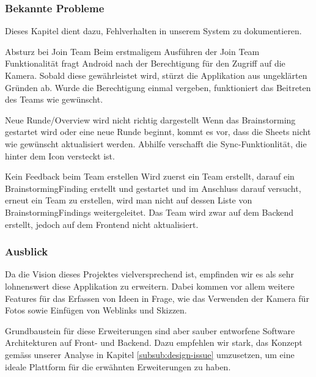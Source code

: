 \subsubsection{Bekannte Probleme}
Dieses Kapitel dient dazu, Fehlverhalten in unserem System zu dokumentieren.

\begin{basedescript}{
		\desclabelstyle{\multilinelabel}
		\desclabelwidth{4.5cm}
		\setlength{\itemsep}{5ex}}
	\item [Absturz bei Join Team] Beim erstmaligem Ausführen der Join Team Funktionalität fragt Android nach der Berechtigung für den Zugriff auf die Kamera. Sobald diese gewährleistet wird, stürzt die Applikation aus ungeklärten Gründen ab. Wurde die Berechtigung einmal vergeben, funktioniert das Beitreten des Teams wie gewünscht.
	
	\item [Neue Runde/Overview wird nicht richtig dargestellt] 
	Wenn das Brainstorming gestartet wird oder eine neue Runde beginnt, kommt es vor, dass die Sheets nicht wie gewünscht aktualisiert werden. Abhilfe verschafft die Sync-Funktionlität, die hinter dem Icon versteckt ist.
	
	\item [Kein Feedback beim Team erstellen] 
	Wird zuerst ein Team erstellt, darauf ein BrainstormingFinding erstellt und gestartet und im Anschluss darauf versucht, erneut ein Team zu erstellen, wird man nicht auf dessen Liste von BrainstormingFindings weitergeleitet. Das Team wird zwar auf dem Backend erstellt, jedoch auf dem Frontend nicht aktualisiert.
\end{basedescript}


\subsubsection{Ausblick}
\label{subsub:Ausblick}

Da die Vision dieses Projektes vielversprechend ist, empfinden wir es als sehr lohnenswert diese Applikation zu erweitern. Dabei kommen vor allem weitere Features für das Erfassen von Ideen in Frage, wie das Verwenden der Kamera für Fotos sowie  Einfügen von Weblinks und Skizzen.

Grundbaustein für diese Erweiterungen sind aber sauber entworfene Software Architekturen auf Front- und Backend. Dazu empfehlen wir stark, das Konzept gemäss unserer Analyse in Kapitel \ref{subsub:design-issue} umzusetzen, um eine ideale Plattform für die erwähnten Erweiterungen zu haben. 

